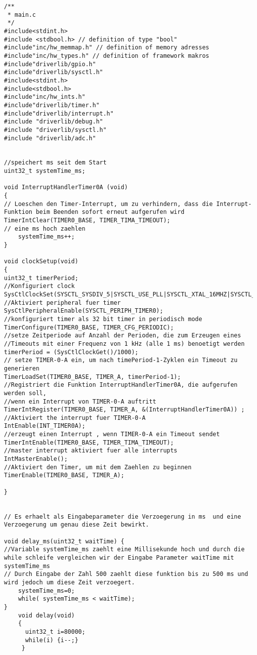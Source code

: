 \begin{lstlisting}
/**
 * main.c
 */
#include<stdint.h>
#include <stdbool.h> // definition of type "bool"
#include"inc/hw_memmap.h" // definition of memory adresses
#include"inc/hw_types.h" // definition of framework makros
#include"driverlib/gpio.h"
#include"driverlib/sysctl.h"
#include<stdint.h>
#include<stdbool.h>
#include"inc/hw_ints.h"
#include"driverlib/timer.h"
#include"driverlib/interrupt.h"
#include "driverlib/debug.h"
#include "driverlib/sysctl.h"
#include "driverlib/adc.h"


//speichert ms seit dem Start
uint32_t systemTime_ms;

void InterruptHandlerTimer0A (void)
{
// Loeschen den Timer-Interrupt, um zu verhindern, dass die Interrupt-Funktion beim Beenden sofort erneut aufgerufen wird
TimerIntClear(TIMER0_BASE, TIMER_TIMA_TIMEOUT);
// eine ms hoch zaehlen
    systemTime_ms++;
}

void clockSetup(void)
{
uint32_t timerPeriod;
//Konfiguriert clock
SysCtlClockSet(SYSCTL_SYSDIV_5|SYSCTL_USE_PLL|SYSCTL_XTAL_16MHZ|SYSCTL_OSC_MAIN);
//Aktiviert peripheral fuer timer
SysCtlPeripheralEnable(SYSCTL_PERIPH_TIMER0);
//konfiguriert timer als 32 bit timer in periodisch mode
TimerConfigure(TIMER0_BASE, TIMER_CFG_PERIODIC);
//setze Zeitperiode auf Anzahl der Perioden, die zum Erzeugen eines
//Timeouts mit einer Frequenz von 1 kHz (alle 1 ms) benoetigt werden
timerPeriod = (SysCtlClockGet()/1000);
// setze TIMER-0-A ein, um nach timePeriod-1-Zyklen ein Timeout zu generieren
TimerLoadSet(TIMER0_BASE, TIMER_A, timerPeriod-1);
//Registriert die Funktion InterruptHandlerTimer0A, die aufgerufen werden soll,
//wenn ein Interrupt von TIMER-0-A auftritt
TimerIntRegister(TIMER0_BASE, TIMER_A, &(InterruptHandlerTimer0A)) ;
//Aktiviert the interrupt fuer TIMER-0-A
IntEnable(INT_TIMER0A);
//erzeugt einen Interrupt , wenn TIMER-0-A ein Timeout sendet
TimerIntEnable(TIMER0_BASE, TIMER_TIMA_TIMEOUT);
//master interrupt aktiviert fuer alle interrupts
IntMasterEnable();
//Aktiviert den Timer, um mit dem Zaehlen zu beginnen
TimerEnable(TIMER0_BASE, TIMER_A);

}


// Es erhaelt als Eingabeparameter die Verzoegerung in ms  und eine Verzoegerung um genau diese Zeit bewirkt.

void delay_ms(uint32_t waitTime) {
//Variable systemTime_ms zaehlt eine Millisekunde hoch und durch die while schleife vergleichen wir der Eingabe Parameter waitTime mit systemTime_ms
// Durch Eingabe der Zahl 500 zaehlt diese funktion bis zu 500 ms und wird jedoch um diese Zeit verzoegert.
    systemTime_ms=0;
    while( systemTime_ms < waitTime);
}
    void delay(void)
    {
      uint32_t i=80000;
      while(i) {i--;}
     }


\end{lstlisting}
